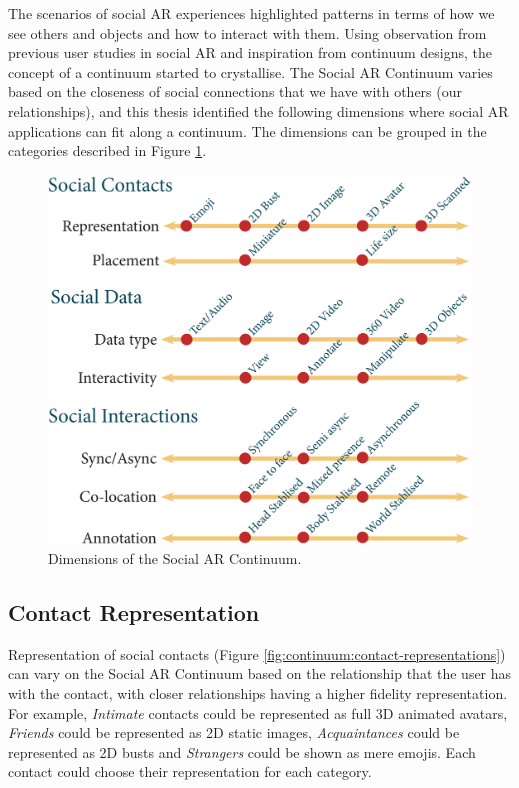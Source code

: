 The scenarios of social AR experiences highlighted patterns in terms of how we see others and objects and how to interact with them. Using observation from previous user studies in social AR and inspiration from continuum designs, the concept of a continuum started to crystallise. The Social AR Continuum varies based on the closeness of social connections that we have with others (our relationships), and this thesis identified the following dimensions where social AR applications can fit along a continuum. The dimensions can be grouped in the categories described in Figure \ref{fig:continuum:dimensions}.

\begin{figure}[ht]
    \centering
    \includegraphics[width=0.8\linewidth]{images/30-continuum/continuum4_1.eps}
    \caption{Dimensions of the Social AR Continuum.}
    \label{fig:continuum:dimensions}
\end{figure}

\subsection{Contact Representation}

Representation of social contacts (Figure \ref{fig:continuum:contact-representations}) can vary on the Social AR Continuum based on the relationship that the user has with the contact, with closer relationships having a higher fidelity representation. For example, \textit{Intimate} contacts could be represented as full 3D animated avatars, \textit{Friends} could be represented as 2D static images, \textit{Acquaintances} could be represented as 2D busts and \textit{Strangers} could be shown as mere emojis. Each contact could choose their representation for each category.

